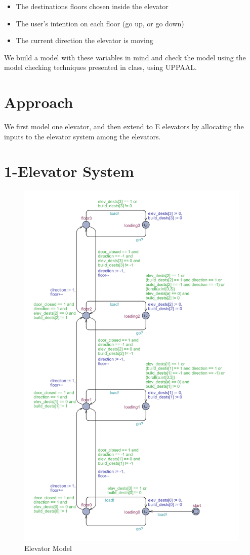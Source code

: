 \documentclass[letterpaper]{article} %
\begin{document}
\begin{itemize}
	\item The destinations floors chosen inside the elevator
	\item The user’s intention on each floor (go up, or go down)
	\item The current direction the elevator is moving
\end{itemize}

We build a model with these variables in mind and check the model using the model checking techniques presented in class, using UPPAAL.

\section{Approach}
We first model one elevator, and then extend to E elevators by allocating the inputs to the elevator system among the elevators. 

\section{1-Elevator System}

\begin{figure}
  \centering
    \includegraphics[scale=0.6]{elevator}
  \caption{Elevator Model}
\end{figure}
\end{document}

